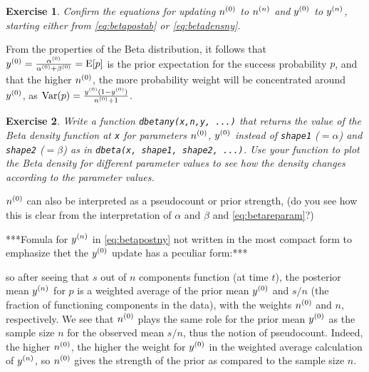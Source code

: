 \documentclass[12pt,a4paper	,twoside]{article}
\newcommand{\E}{\operatorname{E}}
\newcommand{\V}{\operatorname{Var}}
\newtheorem{myex}{Exercise}
\begin{document}
\begin{myex}
Confirm the equations for updating $n^{(0)}$ to $n^{(n)}$ and $y^{(0)}$ to $y^{(n)}$,
starting either from \eqref{eq:betapostab} or \eqref{eq:betadensny}.
\end{myex}

From the properties of the Beta distribution,
it follows that $\yz = \frac{\az}{\az+\bz} = \E[p]$
is the prior expectation for the success probability $p$,
and that the higher $n^{(0)}$, the more probability weight will be concentrated around $y^{(0)}$,
as $\V(p) = \frac{\yz (1-\yz)}{\nz + 1}$.

\begin{myex}
Write a function \texttt{dbetany(x,n,y, ...)}
that returns the value of the Beta density function at \texttt{x}
for parameters $n^{(0)}$, $y^{(0)}$ instead of \texttt{shape1} ($=\alpha$) and \texttt{shape2} ($=\beta$)
as in \texttt{dbeta(x, shape1, shape2, ...)}.
Use your function to plot the Beta density for different parameter values
to see how the density changes according to the parameter values.
\end{myex}

$n^{(0)}$ can also be interpreted as a pseudocount or prior strength,
(do you see how this is clear from the interpretation of $\alpha$ and $\beta$ and \eqref{eq:betareparam}?)

***Fomula for $y^{(n)}$ in \eqref{eq:betapostny} not written in the most compact form
to emphasize thet the $y^{(0)}$ update has a peculiar form:***

so after seeing that $s$ out of $n$ components function (at time $t$),
the posterior mean $y^{(n)}$ for $p$ is a weighted average of
the prior mean $y^{(0)}$ and $s/n$ (the fraction of functioning components in the data),
with the weights $n^{(0)}$ and $n$, respectively.
We see that $n^{(0)}$ plays the same role for the prior mean $y^{(0)}$
as the sample size $n$ for the observed mean $s/n$,
thus the notion of pseudocount.
Indeed, the higher $n^{(0)}$, the higher the weight for $y^{(0)}$
in the weighted average calculation of $y^{(n)}$,
so $n^{(0)}$ gives the strength of the prior as compared to the sample size $n$.
\end{document}
